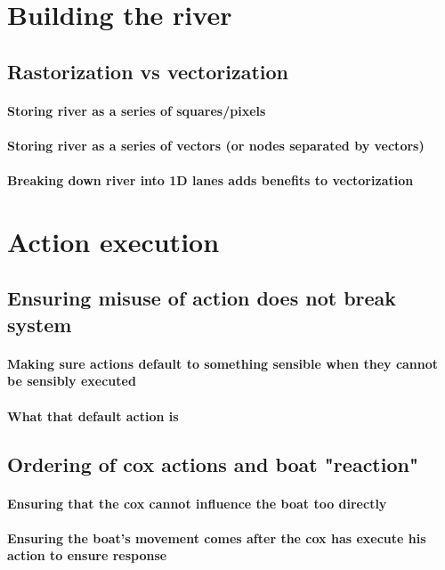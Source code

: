   \section{Building the river}
    \subsection{Rastorization vs vectorization}
      \paragraph{Storing river as a series of squares/pixels}
      \paragraph{Storing river as a series of vectors (or nodes separated by vectors)}
      \paragraph{Breaking down river into 1D lanes adds benefits to vectorization}

  \section{Action execution}
    \subsection{Ensuring misuse of action does not break system}
      \paragraph{Making sure actions default to something sensible when they cannot be sensibly executed}
      \paragraph{What that default action is}
      
    \subsection{Ordering of cox actions and boat "reaction"}
      \paragraph{Ensuring that the cox cannot influence the boat too directly}
      \paragraph{Ensuring the boat's movement comes after the cox has execute his action to ensure response}
